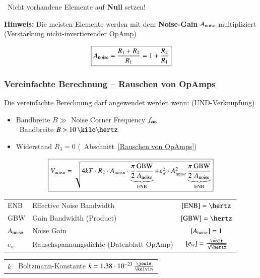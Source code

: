 \textrightarrow\ Nicht vorhandene Elemente auf \textbf{Null} setzen!

\vspace{0.2cm}
\begin{minipage}[c]{0.48\columnwidth}
    \textbf{Hinweis:} Die meisten Elemente werden mit dem \textbf{Noise-Gain} $A_{\rm noise}$ multipliziert 
    (Verstärkung nicht-invertierender OpAmp)
\end{minipage}
\hfill
\begin{minipage}[c]{0.48\columnwidth}
    $$ \boxed{ A_{\rm noise} = \frac{R_1 + R_2}{R_1} = 1 + \frac{R_2}{R_1}}$$
\end{minipage}


\subsubsection{Vereinfachte Berechnung -- Rauschen von OpAmps}

Die vereinfachte Berechnung darf angewendet werden wenn: (UND-Verknüpfung)
\begin{itemize}
    \item Bandbreite $B \gg$ Noise Corner Frequency $f_{\rm enc}$ \\
        \textrightarrow\ Bandbreite $B > 10 \, \kilo \hertz$
    \item Widerstand $R_3 = 0$ (\textrightarrow\ Abschnitt~\ref{Rauschen von OpAmps})
\end{itemize}

$$ \boxed{ V_{\rm noise} = \sqrt{4 k T \cdot R_2 \cdot A_{\rm noise} \cdot \underbrace{ \frac{\pi}{2} \frac{\text{GBW}}{A_{\rm noise}} }_{\text{ENB}}
+ e_w^2 \cdot A_{\rm noise}^2 \underbrace{ \frac{\pi}{2} \frac{\text{GBW}}{A_{\rm noise}} }_{\text{ENB}} }} $$

\begin{tabular}{llc}
    ENB             & Effective Noise Bandwidth                 & $[\text{ENB}] = \hertz$ \\
    GBW             & Gain Bandwidth (Product)                  & $[\text{GBW}] = \hertz$ \\
    $A_{\rm noise}$ & Noise Gain                                & $[A_{\rm noise}] = 1$ \\
    $e_w$           & Rauschspannungsdichte (Datenblatt OpAmp)  & $[e_w] = \frac{\volt}{\sqrt{\hertz}}$ \\
\end{tabular}

\begin{tabular}{ll}
    $k$             & Boltzmann-Konstante $k = 1.38 \cdot 10^{-23} \, \frac{\joule}{\kelvin}$ \\
\end{tabular}
    
